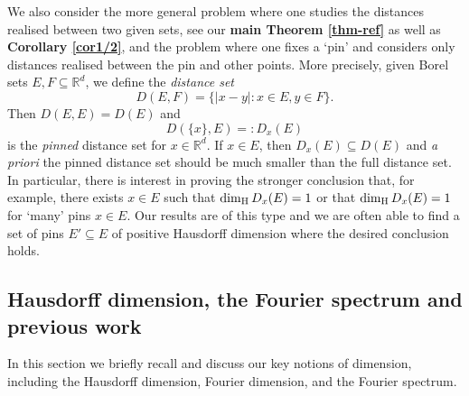 \documentclass[11pt]{amsart}
\numberwithin{equation}{section}
\newcommand{\rd}{\mathbb{R}^d}
\newcommand{\hd}{\dim_{\textup{H}}}
\theoremstyle{plain}
\theoremstyle{remark}
\begin{document}
We also consider the more general problem where one studies the distances realised between two given sets, see our {\bf main Theorem \ref{thm-ref}} as well as {\bf   Corollary \ref{cor1/2}}, and  the problem where one fixes a `pin' and considers only distances realised between the pin and other points.  More precisely, given Borel sets $E,F \subseteq \rd$, we define the \emph{distance set}
\[
D(E,F) = \{ |x-y| : x \in E, y \in F\}.
\]
Then $D(E,E) = D(E)$ and 
\[
D(\{x\}, E) =: D_x(E)
\]
is the \emph{pinned} distance set for $x \in \rd$.  If $x \in E$, then $D_x(E) \subseteq D(E)$ and \emph{a priori} the pinned distance set should be much smaller than the full distance set.  In particular, there is interest in proving the stronger conclusion that, for example, there exists $x \in E$ such that $\hd D_x(E) = 1$ or that $\hd D_x(E) = 1$ for `many' pins $x \in E$. Our results are of this type and we are often able to find a set of pins $E' \subseteq E$ of positive Hausdorff dimension where the desired conclusion holds.   



\subsection{Hausdorff dimension, the Fourier spectrum and previous work}

In this section we briefly recall and discuss our key notions of dimension, including the Hausdorff dimension, Fourier dimension, and the Fourier spectrum.  
\end{document}
